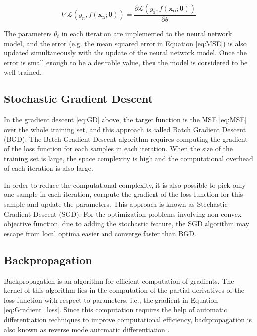 \documentclass[
	parskip, 			   %
	twoside, 			   %
	DIV=14, 			   %
	BCOR=15.0mm, 		   %
	headsepline, 		   %
	open=right, 		   %
	captions=tableheading, %
	bibliography=totoc,    %
	numbers=noenddot       %
]{scrreprt}
\begin{document}
\begin{equation}
    \label{eq:Gradient_loss}
    \nabla \mathcal{L}\left( y_{n},f(\mathbf{x_{n}};\mathbf{\theta}) \right) = \frac{\partial \mathcal{L}\left( y_{n},f(\mathbf{x_{n}};\mathbf{\theta}) \right)}{\partial \theta}
\end{equation}

The parameters $\theta_{t}$ in each iteration are implemented to the neural network model, and the error (e.g. the mean squared error in Equation \ref{eq:MSE}) is also updated simultaneously with the update of the neural network model. Once the error is small enough to be a desirable value, then the model is considered to be well trained.

\subsection{Stochastic Gradient Descent}
In the gradient descent \ref{eq:GD} above, the target function is the MSE \ref{eq:MSE} over the whole training set, and this approach is called Batch Gradient Descent (BGD).  The Batch Gradient Descent algorithm requires computing the gradient of the loss function for each samples in each iteration. When the size of the training set is large, the space complexity is high and the computational overhead of each iteration is also large.

In order to reduce the computational complexity, it is also possible to pick only one sample in each iteration, compute the gradient of the loss function for this sample and update the parameters. This approach is known as Stochastic Gradient Descent (SGD). For the optimization problems involving non-convex objective function, due to adding the stochastic feature, the SGD algorithm may escape from local optima easier and converge faster than BGD.

\subsection{Backpropagation}
Backpropagation is an algorithm for efficient computation of gradients. The kernel of this algorithm lies in the computation of the partial derivatives of the loss function with respect to parameters, i.e., the gradient in Equation \ref{eq:Gradient_loss}. Since this computation requires the help of automatic differentiation techniques to improve computational efficiency, backpropagation is also known as reverse mode automatic differentiation \cite{baydin2018automatic}.
\end{document}
